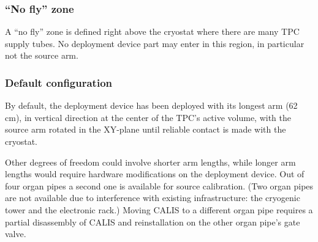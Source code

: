 \subsubsection{``No fly'' zone}
A ``no fly'' zone is defined right above the cryostat where there are many TPC supply tubes. No deployment device part may enter in this region, in particular not the source arm.


\subsubsection{Default configuration}
By default, the deployment device has been deployed with its longest arm (62 cm), in vertical direction at the center of the TPC's active volume, with the source arm rotated in the XY-plane until reliable contact is made with the cryostat. 

Other degrees of freedom could involve shorter arm lengths, while longer arm lengths would require hardware modifications on the deployment device. Out of four organ pipes a second one is available for source calibration. (Two organ pipes are not available due to interference with existing infrastructure: the cryogenic tower and the electronic rack.) Moving CALIS to a different organ pipe requires a partial disassembly of CALIS and reinstallation on the other organ pipe's gate valve.

